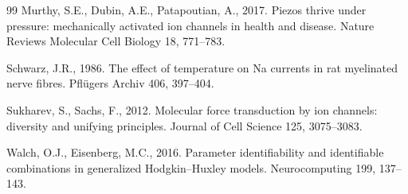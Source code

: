 \begin{thebibliography}{99}
Murthy, S.E., Dubin, A.E., Patapoutian, A., 2017.
Piezos thrive under pressure: mechanically activated ion channels in health and
disease.
Nature Reviews Molecular Cell Biology 18, 771--783.

Schwarz, J.R., 1986.
The effect of temperature on Na currents in rat myelinated nerve fibres.
Pfl\"ugers Archiv 406, 397--404.

Sukharev, S., Sachs, F., 2012.
Molecular force transduction by ion channels: diversity and unifying principles.
Journal of Cell Science 125, 3075--3083.

Walch, O.J., Eisenberg, M.C., 2016.
Parameter identifiability and identifiable combinations in generalized
Hodgkin--Huxley models.
Neurocomputing 199, 137--143.

\end{thebibliography}


